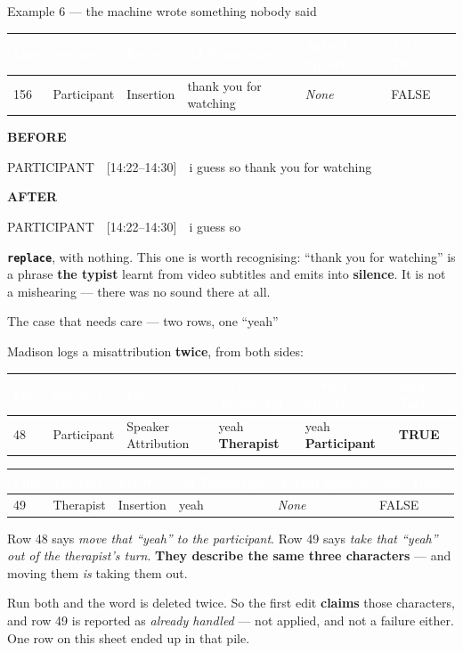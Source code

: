 \documentclass[aspectratio=169]{beamer}
\newcommand{\keybox}[1]{%
  \par\vspace{4pt}\begingroup\centering
  \colorbox{warmbg}{\parbox{0.93\textwidth}{\centering #1}}%
  \par\endgroup\vspace{2pt}}
\newcommand{\sheetrow}[6]{%
  \par\vspace{3pt}\begingroup\centering\footnotesize
  \renewcommand{\arraystretch}{1.3}\setlength{\tabcolsep}{5pt}%
  \begin{tabular}{|>{\raggedright\arraybackslash}p{0.6cm}|>{\raggedright\arraybackslash}p{1.6cm}|>{\raggedright\arraybackslash}p{2.4cm}|>{\raggedright\arraybackslash}p{2.9cm}|>{\raggedright\arraybackslash}p{2.9cm}|>{\raggedright\arraybackslash}p{1.0cm}|}
  \hline
  \rowcolor{hdr}
  \textcolor{white}{\textbf{Line}} & \textcolor{white}{\textbf{Speaker}} &
  \textcolor{white}{\textbf{Error}} & \textcolor{white}{\textbf{AI Transcript}} &
  \textcolor{white}{\textbf{Actual Speech}} & \textcolor{white}{\textbf{Add Turn?}} \\
  \hline
  \rowcolor{warmbg}
  #1 & #2 & #3 & #4 & #5 & #6 \\
  \hline
  \end{tabular}\par\endgroup\vspace{4pt}}
\newcommand{\before}[1]{%
  \par\vspace{3pt}\begingroup\centering
  {\footnotesize\textcolor{soft}{\textbf{BEFORE}}}\par\vspace{1pt}
  \colorbox{coolbg}{\parbox{0.90\textwidth}{\ttfamily\footnotesize #1}}%
  \par\endgroup\vspace{3pt}}
\newcommand{\after}[1]{%
  \par\vspace{2pt}\begingroup\centering
  {\footnotesize\textcolor{good}{\textbf{AFTER}}}\par\vspace{1pt}
  \colorbox{band}{\parbox{0.90\textwidth}{\ttfamily\footnotesize #1}}%
  \par\endgroup\vspace{3pt}}
\newcommand{\opn}[1]{\textcolor{warm}{\textbf{\texttt{#1}}}}
\newcommand{\typist}{\textbf{the typist}}
\begin{document}
\begin{frame}{Example 6 --- the machine wrote something nobody said}

\sheetrow{156}{Participant}{Insertion}{thank you for watching}{\textit{None}}{FALSE}

\before{PARTICIPANT~~[14:22--14:30]~~i guess so thank you for watching}

\after{PARTICIPANT~~[14:22--14:30]~~i guess so}

\keybox{\opn{replace}, with nothing. This one is worth recognising: ``thank you for
watching'' is a phrase \typist{} learnt from video subtitles and emits into \textbf{silence}.
It is not a mishearing --- there was no sound there at all.}

\end{frame}

\begin{frame}{The case that needs care --- two rows, one ``yeah''}

Madison logs a misattribution \textbf{twice}, from both sides:

\sheetrow{48}{Participant}{Speaker Attribution}{yeah \textbf{Therapist}}{yeah \textbf{Participant}}{\textbf{TRUE}}
\vspace{-6pt}
\sheetrow{49}{Therapist}{Insertion}{yeah}{\textit{None}}{FALSE}

\vspace{0.3em}
Row 48 says \emph{move that ``yeah'' to the participant}. Row 49 says \emph{take that
``yeah'' out of the therapist's turn}. \textbf{They describe the same three characters} ---
and moving them \emph{is} taking them out.

\keybox{Run both and the word is deleted twice. So the first edit \textbf{claims} those
characters, and row 49 is reported as \emph{already handled} --- not applied, and not a
failure either. One row on this sheet ended up in that pile.}

\end{frame}
\end{document}
